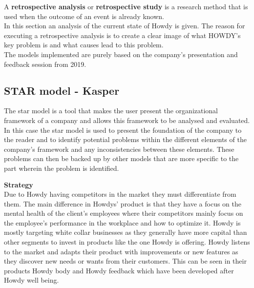 

A \textbf{retrospective analysis} or \textbf{retrospective study} is a research method that is used when the outcome of an event is already known.\\
\noindent In this section an analysis of the current state of Howdy is given. The reason for executing a retrospective analysis is to create a clear image of what HOWDY’s key problem is and what causes lead to this problem.\\
\noindent The models implemented are purely based on the company’s presentation and feedback session from 2019.



\subsection{STAR model - Kasper}
The star model is a tool that makes the user present the organizational framework of a company and allows this framework to be analysed and evaluated. In this case the star model is used to present the foundation of the company to the reader and to identify potential problems within the different elements of the company’s framework and any inconsistencies between these elements. These problems can then be backed up by other models that are more specific to the part wherein the problem is identified.

\noindent \textbf{Strategy}\\
\noindent Due to Howdy having competitors in the market they must differentiate from them. The main difference in Howdys' product is that they have a focus on the mental health of the client’s employees where their competitors mainly focus on the employee’s performance in the workplace and how to optimize it. Howdy is mostly targeting white collar businesses as they generally have more capital than other segments to invest in products like the one Howdy is offering.
Howdy listens to the market and adapts their product with improvements or new features as they discover new needs or wants from their customers. This can be seen in their products Howdy body and Howdy feedback which have been developed after Howdy well being.

